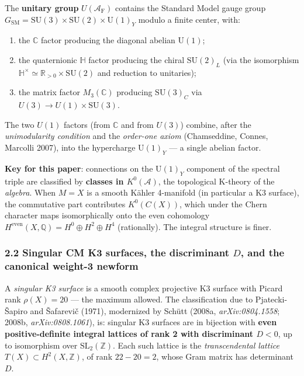 \documentclass[
  11pt,
  a4paper,
]{article}
\begin{document}
The \textbf{unitary group} \(U(\mathcal A_{\mathrm{F}})\) contains the Standard Model gauge group \(G_{\mathrm{SM}} = \mathrm{SU}(3) \times \mathrm{SU}(2) \times \mathrm{U}(1)_Y\) modulo a finite center, with:

\begin{enumerate}
\def\labelenumi{(\roman{enumi})}
\item
  the \(\mathbb C\) factor producing the diagonal abelian \(\mathrm{U}(1)\);
\item
  the quaternionic \(\mathbb H\) factor producing the chiral \(\mathrm{SU}(2)_L\) (via the isomorphism \(\mathbb H^\times \simeq \mathbb R_{>0} \times \mathrm{SU}(2)\) and reduction to unitaries);
\item
  the matrix factor \(M_3(\mathbb C)\) producing \(\mathrm{SU}(3)_C\) via \(U(3) \to U(1) \times \mathrm{SU}(3)\).
\end{enumerate}

The two \(U(1)\) factors (from \(\mathbb C\) and from \(U(3)\)) combine, after the \emph{unimodularity condition} and the \emph{order-one axiom} (Chamseddine, Connes, Marcolli 2007), into the hypercharge \(\mathrm{U}(1)_Y\) --- a single abelian factor.

\textbf{Key for this paper}: connections on the \(\mathrm{U}(1)_Y\) component of the spectral triple are classified by \textbf{classes in \(K^0(\mathcal A)\)}, the topological K-theory of the \emph{algebra}. When \(M = X\) is a smooth Kähler 4-manifold (in particular a K3 surface), the commutative part contributes \(K^0(C(X))\), which under the Chern character maps isomorphically onto the even cohomology \(H^{\mathrm{even}}(X, \mathbb Q) = H^0 \oplus H^2 \oplus H^4\) (rationally). The integral structure is finer.

\hypertarget{singular-cm-k3-surfaces-the-discriminant-d-and-the-canonical-weight-3-newform}{%
\subsubsection{\texorpdfstring{2.2 Singular CM K3 surfaces, the discriminant \(D\), and the canonical weight-3 newform}{2.2 Singular CM K3 surfaces, the discriminant D, and the canonical weight-3 newform}}\label{singular-cm-k3-surfaces-the-discriminant-d-and-the-canonical-weight-3-newform}}

A \emph{singular K3 surface} is a smooth complex projective K3 surface with Picard rank \(\rho(X) = 20\) --- the maximum allowed. The classification due to Pjatecki-Šapiro and Šafarevič (1971), modernized by Schütt (2008a, \emph{arXiv:0804.1558}; 2008b, \emph{arXiv:0808.1061}), is: singular K3 surfaces are in bijection with \textbf{even positive-definite integral lattices of rank 2 with discriminant \(D < 0\)}, up to isomorphism over \(\mathrm{SL}_2(\mathbb Z)\). Each such lattice is the \emph{transcendental lattice} \(T(X) \subset H^2(X, \mathbb Z)\), of rank \(22 - 20 = 2\), whose Gram matrix has determinant \(D\).
\end{document}
